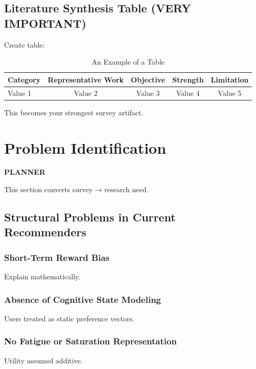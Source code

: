 \documentclass[lettersize,journal]{IEEEtran}
\begin{document}
\subsection{Literature Synthesis Table (VERY IMPORTANT)}

Create table:

\begin{table}[!t]
\caption{An Example of a Table\label{tab:tableABC}}
\centering
\begin{tabular}{|l||c||c||c||c|}
\hline
Category & Representative Work & Objective & Strength & Limitation \\
\hline
Value 1 & Value 2 & Value 3 & Value 4 & Value 5 \\
\hline
\end{tabular}
\end{table}

This becomes your strongest survey artifact.

% 
\section{Problem Identification}

\textbf{PLANNER}

This section converts survey → research need.

\subsection{Structural Problems in Current Recommenders}

\subsubsection{Short-Term Reward Bias}

Explain mathematically.

\subsubsection{Absence of Cognitive State Modeling}

Users treated as static preference vectors.

\subsubsection{No Fatigue or Saturation Representation}

Utility assumed additive.
\end{document}
